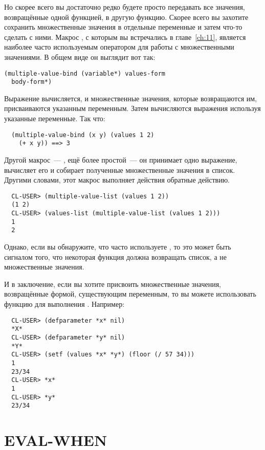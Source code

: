 Но скорее всего вы достаточно редко будете просто передавать все значения, возвращённые
одной функцией, в другую функцию.  Скорее всего вы захотите сохранить множественные
значения в отдельные переменные и затем что-то сделать с ними.  Макрос
, с которым вы встречались в главе~\ref{ch:11}, является
наиболее часто используемым оператором для работы с множественными значениями.  В общем
виде он выглядит вот так:

\begin{lstlisting}
(multiple-value-bind (variable*) values-form
  body-form*)
\end{lstlisting}

Выражение  вычисляется, и множественные значения, которые возвращаются
им, присваиваются указанным переменным.  Затем вычисляются выражения 
используя указанные переменные.  Так что:

\begin{verbatim}
  (multiple-value-bind (x y) (values 1 2)
    (+ x y)) ==> 3
\end{verbatim}

Другой макрос~--- , ещё более простой~--- он принимает одно
выражение, вычисляет его и собирает полученные множественные значения в список.  Другими
словами, этот макрос выполняет действия обратные действию.

\begin{verbatim}
  CL-USER> (multiple-value-list (values 1 2))
  (1 2)
  CL-USER> (values-list (multiple-value-list (values 1 2)))
  1
  2
\end{verbatim}

Однако, если вы обнаружите, что часто используете , то это может
быть сигналом того, что некоторая функция должна возвращать список, а не множественные
значения.

И в заключение, если вы хотите присвоить множественные значения, возвращённые формой,
существующим переменным, то вы можете использовать функцию  для выполнения
.  Например:

\begin{verbatim}
  CL-USER> (defparameter *x* nil)
  *X*
  CL-USER> (defparameter *y* nil)
  *Y*
  CL-USER> (setf (values *x* *y*) (floor (/ 57 34)))
  1
  23/34
  CL-USER> *x*
  1
  CL-USER> *y*
  23/34
\end{verbatim}

\section{EVAL-WHEN}

